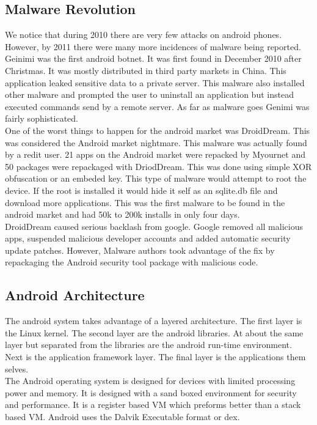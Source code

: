 \documentclass[letterpaper, onecolumn,10pt]{IEEEtran}
\begin{document}
		     \subsection{Malware Revolution}
		     We notice that during 2010 there are very few attacks on android phones. However, by 2011 there were many more incidences of malware being reported. Geinimi was the first android botnet. It was first found in December 2010 after Christmas. It was mostly distributed in third party markets in China. This application leaked sensitive data to a private server. This malware also installed other malware and prompted the user to uninstall an application but instead executed commands send by a remote server. As far as malware goes Genimi was fairly sophisticated.\\
		     
		    One of the worst things to happen for the android market was DroidDream. This was considered the Android market nightmare. This malware was actually found by a redit user. 21 apps on the Android market were repacked by Myournet and 50 packages were repackaged with DriodDream. This was done using simple XOR obfuscation or an embeded key. This type of malware would attempt to root the device. If the root is installed it would hide it self as an sqlite.db file and download more applications. This was the first malware to be found in the android market and had 50k to 200k installs in only four days.\\
		    
		    DroidDream caused serious backlash from google. Google removed all malicious apps, suspended malicious developer accounts and added automatic security update patches. However, Malware authors took advantage of the fix by repackaging the Android security tool package with malicious code.\\
		    
		    \subsection{Android Architecture}
		    The android system takes advantage of a layered architecture. The first layer is the Linux kernel. The second layer are the android libraries. At about the same layer but separated from the libraries are the android run-time environment. Next is the application framework layer. The final layer is the applications them selves.\\
		    
		    The Android operating system is designed for devices with limited processing power and memory. It is designed with a sand boxed environment for security and performance. It is a register based VM which preforms better than a stack based VM. Android uses the Dalvik Executable format or dex.\\

			
		
\end{document}
